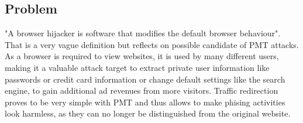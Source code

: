 \subsection{Problem}
"A browser hijacker is software that modifies the default browser behaviour"\cite{automatedspywarecollection}. That is a very vague definition but reflects on possible candidate of PMT attacks. As a browser is required to view websites, it is used by many different users, making it a valuable attack target to extract private user information like passwords or credit card information or change default settings like the search engine, to gain additional ad revenues from more visitors. Traffic redirection proves to be very simple with PMT and thus allows to make phising activities look harmless, as they can no longer be distinguished from the original website.
